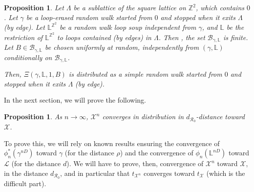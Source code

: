 \documentclass[11pt]{article}
\newtheorem{proposition}[theorem]{Proposition}
\def\Conf{{\mathscr{R}}}
\def\Att{{\Xi}}
\begin{document}
\begin{proposition}
  \label{prop:RW=LERW+RWLS}
  Let $\Lambda$ be a sublattice of the square lattice on $\mathbb{Z}^2$, which contains $0$.
  Let $\gamma$ be a loop-erased random walk started from $0$ and stopped when it exits $\Lambda$ (by edge). Let $\mathbb{L}^{\mathbb{Z}^2}$ be a random walk loop soup independent from $\gamma$, and
  $\mathbb{L}$ be the restriction of $\mathbb{L}^{\mathbb{Z}^2}$ to loops contained (by edges) in $\Lambda$.
  Then , the set $\mathcal{B}_{\gamma,\mathbb{L}}$ is finite. Let $B\in \mathcal{B}_{\gamma,\mathbb{L}}$ be chosen uniformly at random, independently from $(\gamma, \mathbb{L})$
  conditionally on $\mathcal{B}_{\gamma, \mathbb{L}}$.

  Then, $\Att(\gamma,\mathbb{L},1,B)$ is distributed as a simple random walk started from $0$ and stopped when it exits $\Lambda$ (by edge).
\end{proposition}
In the next section, we will prove the following.
\begin{proposition}
  \label{prop:converg}
  As $n\to \infty$,
  $\mathcal{X}^n$ converges in distribution in $d_{\Conf_0}$-distance toward $\mathcal{X}$.
\end{proposition}
To prove this, we will rely on known results ensuring the convergence of $\phi_n^*(\gamma^{nD})$ toward $\gamma$ (for the distance $\rho$) and the convergence of $\phi_n(\mathbb{L}^{nD})$ toward $\mathcal{L}$ (for the distance $d$). We will have to prove, then, convergence of $\mathcal{X}^n$ toward $\mathcal{X}$, in the distance $d_{\Conf_0}$, and in particular that $t_{\mathcal{X}^n}$ converges toward $t_{\mathcal{X}}$ (which is the difficult part).
%
\end{document}
